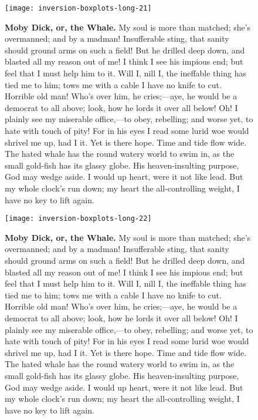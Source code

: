 \documentclass{article}
\begin{document}
\begin{figure}[!htp]
  \begin{center}
      \texttt{[image: inversion-boxplots-long-21]}
    \caption{
        \textbf{Moby Dick, or, the Whale.}
My soul is more than matched; she's overmanned; and by a madman! Insufferable sting, that sanity should ground arms on such a field! But he drilled deep down, and blasted all my reason out of me! I think I see his impious end; but feel that I must help him to it. Will I, nill I, the ineffable thing has tied me to him; tows me with a cable I have no knife to cut. Horrible old man! Who's over him, he cries;—aye, he would be a democrat to all above; look, how he lords it over all below! Oh! I plainly see my miserable office,—to obey, rebelling; and worse yet, to hate with touch of pity! For in his eyes I read some lurid woe would shrivel me up, had I it. Yet is there hope. Time and tide flow wide. The hated whale has the round watery world to swim in, as the small gold-fish has its glassy globe. His heaven-insulting purpose, God may wedge aside. I would up heart, were it not like lead. But my whole clock's run down; my heart the all-controlling weight, I have no key to lift again. 
    }
  \end{center}
\end{figure}

\begin{figure}[!htp]
  \begin{center}
      \texttt{[image: inversion-boxplots-long-22]}
    \caption{
        \textbf{Moby Dick, or, the Whale.}
My soul is more than matched; she's overmanned; and by a madman! Insufferable sting, that sanity should ground arms on such a field! But he drilled deep down, and blasted all my reason out of me! I think I see his impious end; but feel that I must help him to it. Will I, nill I, the ineffable thing has tied me to him; tows me with a cable I have no knife to cut. Horrible old man! Who's over him, he cries;—aye, he would be a democrat to all above; look, how he lords it over all below! Oh! I plainly see my miserable office,—to obey, rebelling; and worse yet, to hate with touch of pity! For in his eyes I read some lurid woe would shrivel me up, had I it. Yet is there hope. Time and tide flow wide. The hated whale has the round watery world to swim in, as the small gold-fish has its glassy globe. His heaven-insulting purpose, God may wedge aside. I would up heart, were it not like lead. But my whole clock's run down; my heart the all-controlling weight, I have no key to lift again. 
    }
  \end{center}
\end{figure}
\end{document}
